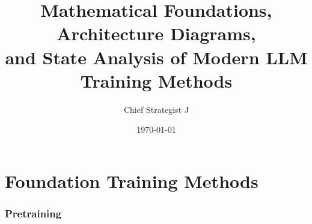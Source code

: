 
\title{\textbf{Mathematical Foundations, Architecture Diagrams,\\and State Analysis of Modern LLM Training Methods}}
\author{Chief Strategist J}
\date{\today}
\maketitle
\tableofcontents
\newpage

\part{Foundation Training Methods}

\section{Pretraining}

